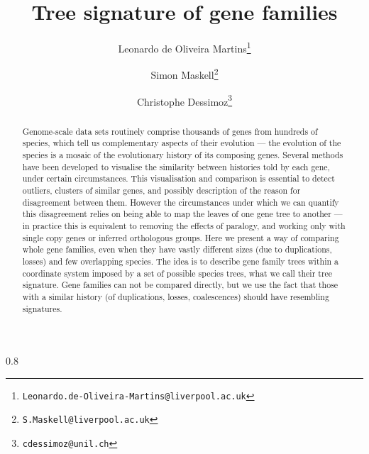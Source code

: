 \documentclass[pdftex,12pt,a4paper,openany,fleqn]{article}
\title{Tree signature of gene families}
\author[1]{Leonardo de Oliveira Martins\thanks{{\tt Leonardo.de-Oliveira-Martins@liverpool.ac.uk}}}
\author[1]{Simon Maskell\thanks{{\tt S.Maskell@liverpool.ac.uk}}}
\author[2]{Christophe Dessimoz\thanks{{\tt cdessimoz@unil.ch}}}
\affil[1]{Department of Electrical Engineering and Electronics, University of Liverpool}
\affil[2]{UNIL}
\date{\vspace{-5ex}}
\begin{document}
\maketitle

\begin{abstract}
Genome-scale data sets routinely comprise thousands of genes from hundreds of species, which tell us complementary
aspects of their evolution --- the evolution of the species is a mosaic of the evolutionary history of its composing
genes.
Several methods have been developed to visualise the similarity between histories told by each gene, under certain
circumstances.
This visualisation and comparison is essential to detect outliers, clusters of similar genes, and possibly description
of the reason for disagreement between them.
However the circumstances under which we can quantify this disagreement relies on being able to map 
the leaves of one gene tree to another --- in practice this is equivalent to removing the effects of paralogy, and
working only with single copy genes or inferred orthologous groups.
Here we present a way of comparing whole gene families, even when they have vastly different sizes (due to duplications,
losses) and few overlapping species. 
The idea is to describe gene family trees within a coordinate system imposed by a set of possible species trees, what we
call their tree signature.
Gene families can not be compared directly, but we use the fact that those with a similar history (of duplications,
losses, coalescences) should have resembling signatures.
\end{abstract}






\begin{spacing}{0.8}  \end{spacing}
\end{document}
